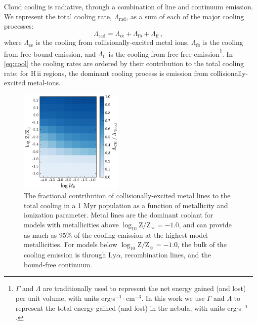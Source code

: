 \documentclass[linenumbers, tighten, trackchanges]{aastex61}%
\newcommand{\Eq}[1]{\autoref{eq:#1}}
\newcommand{\logten}{\ensuremath{\log_{10}}}
\newcommand{\hii}{H\,{\sc ii}\xspace}
\newcommand{\logZeq}[1]{\ensuremath{\logten \mathrm{Z}/\mathrm{Z}_{\sun} = #1}}
\newcommand{\Cool}{\ensuremath{\Lambda_{\mathrm{rad}}}}
\begin{document}
Cloud cooling is radiative, through a combination of line and continuum emission. We represent the total cooling rate, \Cool{}, as a sum of each of the major cooling processes:
\begin{equation}\label{eq:cool}
    \Lambda_{\mathrm{rad}} = \Lambda_{\mathrm{ce}} + \Lambda_{\mathrm{fb}} + \Lambda_{\mathrm{ff}} \, ,
\end{equation}
where $\Lambda_{\mathrm{ce}}$ is the cooling from collisionally-excited metal ions, $\Lambda_{\mathrm{fb}}$ is the cooling from free-bound emission, and $\Lambda_{\mathrm{ff}}$ is the cooling from free-free emission\footnote{$\Gamma$ and $\Lambda$ are traditionally used to represent the net energy gained (and lost) per unit volume, with units erg$\cdot$s$^{-1}\cdot$cm$^{-3}$. In this work we use $\Gamma$ and $\Lambda$ to represent the total energy gained (and lost) in the nebula, with units erg$\cdot$s$^{-1}$.}. In \Eq{cool} the cooling rates are ordered by their contribution to the total cooling rate; for \hii regions, the dominant cooling process is emission from collisionally-excited metal-ions.

\begin{figure}[!htbp]
  \begin{centering}
    \includegraphics[width=0.45\textwidth]{f5.pdf}
    \caption{The fractional contribution of collisionally-excited metal lines to the total cooling in a 1 Myr population as a function of metallicity and ionization parameter. Metal lines are the dominant coolant for models with metallicities above \deleted{$\sim$}\logZeq{-1.0}, and can provide as much as 95\% of the cooling emission at the highest model metallicities. For models  below \deleted{$\sim$}\logZeq{-1.0}, the bulk of the cooling emission is through Ly$\alpha$, recombination lines, and the bound-free continuum.}
    \label{fig:cooling}
  \end{centering}
\end{figure}
\end{document}
